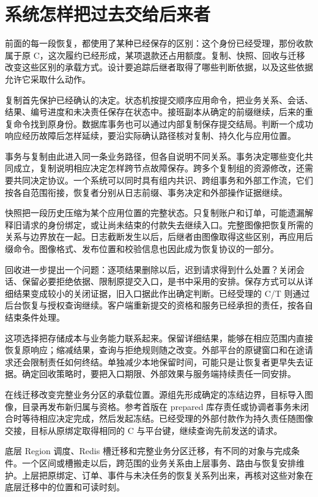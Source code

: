\section*{系统怎样把过去交给后来者}

前面的每一段恢复，都使用了某种已经保存的区别：这个身份已经受理，那份收款属于原 C，这次履约已经形成，某项退款还占用额度。复制、快照、回收与迁移改变这些区别的承载方式。设计要追踪后继者取得了哪些判断依据，以及这些依据允许它采取什么动作。

复制首先保护已经确认的决定。状态机按提交顺序应用命令，把业务关系、会话、结果、编号进度和未决责任保存在状态中。接班副本从确定的前缀继续，后来的重复命令找到原身份。数据库事务也可以通过内部复制保存提交结局。判断一个成功响应经历故障后怎样延续，要沿实际确认路径核对复制、持久化与应用位置。

事务与复制由此进入同一条业务路径，但各自说明不同关系。事务决定哪些变化共同成立，复制说明相应决定怎样跨节点故障保存。跨多个复制组的资源修改，还需要共同决定协议。一个系统可以同时具有组内共识、跨组事务和外部工作流，它们按各自范围衔接，恢复者分别从日志前缀、事务决定和外部操作证据继续。

快照把一段历史压缩为某个应用位置的完整状态。只复制账户和订单，可能遗漏解释旧请求的身份绑定，或让尚未结束的付款失去继续入口。完整图像把恢复所需的关系与边界放在一起。日志截断发生以后，后继者由图像取得这些区别，再应用后缀命令。图像格式、发布位置和校验信息也因此成为恢复协议的一部分。

回收进一步提出一个问题：逐项结果删除以后，迟到请求得到什么处置？关闭会话、保留必要拒绝依据、限制原提交入口，是书中采用的安排。保存方式可以从详细结果变成较小的关闭证据，旧入口据此作出确定判断。已经受理的 C/T 则通过后台恢复与授权查询继续。客户端重新提交的资格和服务已经承担的责任，按各自结束条件处理。

这项选择把存储成本与业务能力联系起来。保留详细结果，能够在相应范围内直接恢复原响应；缩减结果，查询与拒绝规则随之改变。外部平台的原键窗口和在途请求还会限制责任如何终结。单独减少本地保留时间，可能只是让恢复者更早失去证据。确定回收策略时，要把入口期限、外部效果与服务端持续责任一同安排。

在线迁移改变完整业务分区的承载位置。源组先形成确定的冻结边界，目标导入图像，目录再发布新归属与资格。参考首版在 prepared 库存责任或协调者事务未闭合时等待相应决定完成，然后发起冻结。已经受理的外部付款作为持久责任随图像交接，目标从原绑定取得相同的 C 与平台键，继续查询先前发送的请求。

底层 Region 调度、Redis 槽迁移和完整业务分区迁移，有不同的对象与完成条件。一个区间或槽搬走以后，跨范围的业务关系由上层事务、路由与恢复安排维护。上层把原绑定、订单、事件与未决任务的恢复关系列出来，再核对这些对象在底层迁移中的位置和可读时刻。


